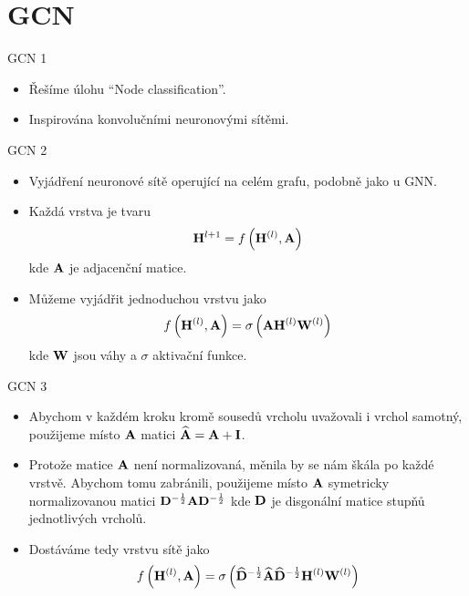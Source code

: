 \documentclass[10pt]{beamer}
\newcommand{\mathmat}{\ensuremath{\mathbf}}
\begin{document}
\section{GCN}

\begin{frame}{GCN 1}
	\begin{itemize}
		\item Řešíme úlohu \enquote{Node classification}.
		\item Inspirována konvolučními neuronovými sítěmi.
	\end{itemize}
\end{frame}

\begin{frame}{GCN 2}
	\begin{itemize}
		\item Vyjádření neuronové sítě operující na celém grafu, podobně jako u GNN.
		\item Každá vrstva je tvaru
			\[ \mathmat{H}^{l + 1} = f \left( \mathmat{H}^{(l)}, \mathmat{A} \right) \]
			kde \( \mathmat{A} \) je adjacenční matice.
		\item Můžeme vyjádřit jednoduchou vrstvu jako
			\[ f \left( \mathmat{H}^{(l)}, \mathmat{A} \right) = \sigma \left( \mathmat{A} \mathmat{H}^{(l)} \mathmat{W}^{(l)} \right) \]
			kde \( \mathmat{W} \) jsou váhy a \( \sigma \) aktivační funkce.
	\end{itemize}
\end{frame}

\begin{frame}{GCN 3}
	\begin{itemize}
		\item Abychom v každém kroku kromě sousedů vrcholu uvažovali i vrchol samotný, použijeme místo \( \mathmat{A} \) matici \( \widehat{\mathmat{A}} = \mathmat{A} + \mathmat{I} \).
		\item Protože matice \( \mathmat{A} \) není normalizovaná, měnila by se nám škála po každé vrstvě. Abychom tomu zabránili, použijeme místo \( \mathmat{A} \) symetricky normalizovanou matici \( \mathmat{D}^{-\frac{1}{2}} \mathmat{A} \mathmat{D}^{-\frac{1}{2}} \) kde \( \mathmat{D} \) je disgonální matice stupňů jednotlivých vrcholů.
		\item Dostáváme tedy vrstvu sítě jako
			\[ f \left( \mathmat{H}^{(l)}, \mathmat{A} \right) = \sigma \left( \widehat{\mathmat{D}}^{-\frac{1}{2}} \widehat{\mathmat{A}} \widehat{\mathmat{D}}^{-\frac{1}{2}} \mathmat{H}^{(l)} \mathmat{W}^{(l)} \right) \]
	\end{itemize}
\end{frame}
\end{document}
